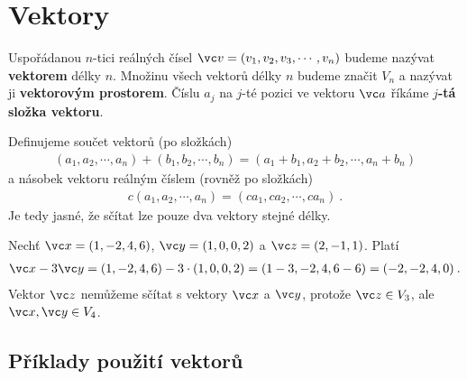 \section{Vektory}

Uspořádanou $n$-tici reálných čísel $\vc v = (v_1,v_2,v_3, \cdots, v_n)$ budeme nazývat \textbf{vektorem} délky $n$. Množinu všech vektorů délky $n$ budeme značit $V_n$ a nazývat ji \textbf{vektorovým prostorem}. Číslu $a_j$ na $j$-té pozici ve vektoru $\vc a$ říkáme \textbf{$j$-tá složka vektoru}.

Definujeme součet vektorů (po složkách) \begin{align}
    (a_1,a_2,\cdots, a_n) + (b_1,b_2,\cdots, b_n) = (a_1+b_1, a_2 + b_2, \cdots , a_n + b_n)
\end{align}
a násobek vektoru reálným číslem (rovněž po složkách) \begin{align}
    c (a_1, a_2, \cdots, a_n) = (c a_1, c a_2, \cdots, c a_n) \:.
\end{align}
Je tedy jasné, že sčítat lze pouze dva vektory stejné délky.

\begin{example}
    Nechť $\vc x = (1,-2,4,6)$, $\vc y = (1,0,0,2)$ a $\vc z = (2,-1,1)$. Platí \begin{align}
        \vc x - 3 \vc y = (1,-2,4,6) - 3\cdot(1,0,0,2) = (1-3,-2,4,6-6) = (-2,-2,4,0) \:.
    \end{align}
    Vektor $\vc z$ nemůžeme sčítat s vektory $\vc x$ a $\vc y$, protože $\vc z \in V_3$, ale $\vc x, \vc y \in V_4$.
\end{example}

\subsection*{Příklady použití vektorů}

